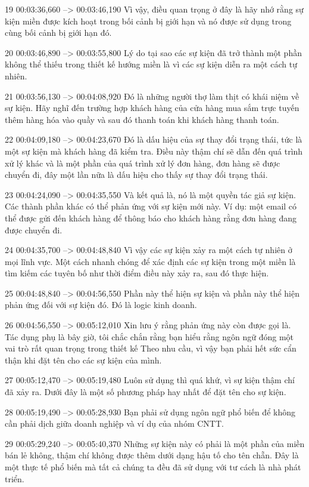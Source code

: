19
00:03:36,660 --> 00:03:46,190
Vì vậy, điều quan trọng ở đây là hãy nhớ rằng sự kiện miền được kích hoạt trong bối cảnh bị giới hạn và nó được sử dụng trong cùng bối cảnh bị giới hạn đó.

20
00:03:46,890 --> 00:03:55,800
Lý do tại sao các sự kiện đã trở thành một phần không thể thiếu trong thiết kế hướng miền là vì các sự kiện diễn ra một cách tự nhiên.

21
00:03:56,130 --> 00:04:08,920
Đó là những người thợ làm thịt có khái niệm về sự kiện.  Hãy nghĩ đến trường hợp khách hàng của cửa hàng mua sắm trực tuyến thêm hàng hóa vào quầy và sau đó thanh toán khi khách hàng thanh toán.

22
00:04:09,180 --> 00:04:23,670
Đó là dấu hiệu của sự thay đổi trạng thái, tức là một sự kiện mà khách hàng đã kiểm tra.  Điều này thậm chí sẽ dẫn đến quá trình xử lý khác và là một phần của quá trình xử lý đơn hàng, đơn hàng sẽ được chuyển đi, đây một lần nữa là dấu hiệu cho thấy sự thay đổi trạng thái.

23
00:04:24,090 --> 00:04:35,550
Và kết quả là, nó là một quyền tác giả sự kiện.  Các thành phần khác có thể phản ứng với sự kiện mới này.  Ví dụ: một email có thể được gửi đến khách hàng để thông báo cho khách hàng rằng đơn hàng đang được chuyển đi.

24
00:04:35,700 --> 00:04:48,840
Vì vậy các sự kiện xảy ra một cách tự nhiên ở mọi lĩnh vực.  Một cách nhanh chóng để xác định các sự kiện trong một miền là tìm kiếm các tuyên bố như thời điểm điều này xảy ra, sau đó thực hiện.

25
00:04:48,840 --> 00:04:56,550
Phần này thể hiện sự kiện và phần này thể hiện phản ứng đối với sự kiện đó.  Đó là logic kinh doanh.

26
00:04:56,550 --> 00:05:12,010
Xin lưu ý rằng phản ứng này còn được gọi là.  Tác dụng phụ là bây giờ, tôi chắc chắn rằng bạn hiểu rằng ngôn ngữ đóng một vai trò rất quan trọng trong thiết kế Theo nhu cầu, vì vậy bạn phải hết sức cẩn thận khi đặt tên cho các sự kiện của mình.

27
00:05:12,470 --> 00:05:19,480
Luôn sử dụng thì quá khứ, vì sự kiện thậm chí đã xảy ra.  Dưới đây là một số phương pháp hay nhất để đặt tên cho sự kiện.

28
00:05:19,490 --> 00:05:28,930
Bạn phải sử dụng ngôn ngữ phổ biến để không cần phải dịch giữa doanh nghiệp và ví dụ của nhóm CNTT.

29
00:05:29,240 --> 00:05:40,370
Những sự kiện này có phải là một phần của miền bán lẻ không, thậm chí không được thêm dưới dạng hậu tố cho tên chẵn.  Đây là một thực tế phổ biến mà tất cả chúng ta đều đã sử dụng với tư cách là nhà phát triển.

